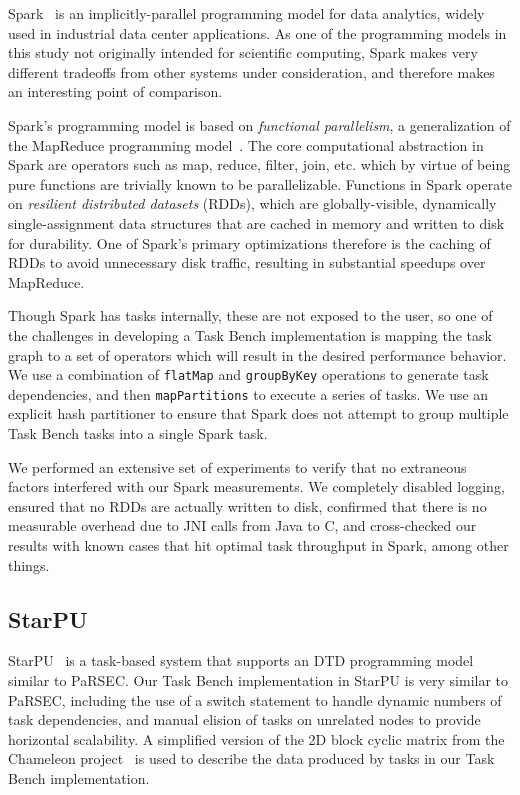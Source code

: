 Spark~\cite{Spark10} is an implicitly-parallel programming model for
data analytics, widely used in industrial data center applications. As
one of the programming models in this study not originally intended
for scientific computing, Spark makes very different tradeoffs from
other systems under consideration, and therefore makes an interesting
point of comparison.

Spark's programming model is based on \emph{functional parallelism}, a
generalization of the MapReduce programming
model~\cite{MapReduce04}. The core computational abstraction in Spark
are operators such as map, reduce, filter, join, etc. which by virtue
of being pure functions are trivially known to be
parallelizable. Functions in Spark operate on \emph{resilient
  distributed datasets} (RDDs), which are globally-visible,
dynamically single-assignment data structures that are cached in memory
and written to disk for durability. One of Spark's primary
optimizations therefore is the caching of RDDs to avoid unnecessary
disk traffic, resulting in substantial speedups over MapReduce.

Though Spark has tasks internally, these are not exposed to the user,
so one of the challenges in developing a Task Bench implementation is
mapping the task graph to a set of operators which will result in the
desired performance behavior. We use a combination of
\lstinline[language=Scala]{flatMap} and
\lstinline[language=Scala]{groupByKey} operations to generate task
dependencies, and then \lstinline[language=Scala]{mapPartitions} to execute a
series of tasks. We use an explicit hash partitioner to ensure that
Spark does not attempt to group multiple Task Bench tasks into a
single Spark task.

We performed an extensive set of experiments to verify that no
extraneous factors interfered with our Spark measurements. We
completely disabled logging, ensured that no RDDs are actually written
to disk, confirmed that there is no measurable overhead due to JNI
calls from Java to C, and cross-checked our results with known cases
that hit optimal task throughput in Spark, among other things.

\subsection{StarPU}

StarPU~\cite{StarPU11} is a task-based system that supports an DTD
programming model similar to PaRSEC. Our Task Bench implementation in
StarPU is very similar to PaRSEC, including the use of a switch
statement to handle dynamic numbers of task dependencies, and manual
elision of tasks on unrelated nodes to provide horizontal scalability.
A simplified version of the 2D block cyclic matrix from the Chameleon 
project~\cite{Chameleon} is used to describe the data produced by tasks in 
our Task Bench implementation.

